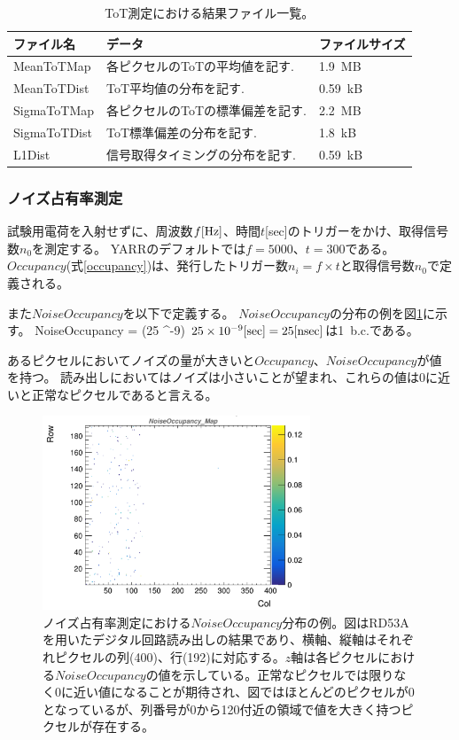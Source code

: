 \begin{table}[tbp]
\begin{center}
\caption[ToT測定における結果ファイル一覧]{ToT測定における結果ファイル一覧。}
\label{tot_result_files}
  \small
  \begin{tabular}{|lll|} \hline
    ファイル名 & データ & ファイルサイズ \\ \hline
    MeanToTMap   & 各ピクセルのToTの平均値を記す.   & 1.9~MB \\ 
    MeanToTDist  & ToT平均値の分布を記す.           & 0.59~kB \\ 
    SigmaToTMap  & 各ピクセルのToTの標準偏差を記す. & 2.2~MB \\ 
    SigmaToTDist & ToT標準偏差の分布を記す.         & 1.8~kB \\ 
    L1Dist       & 信号取得タイミングの分布を記す.  & 0.59~kB \\ \hline 
  \end{tabular}
\end{center}
\end{table}

\subsubsection{ノイズ占有率測定}
試験用電荷を入射せずに、周波数$f[{\rm Hz}]$、時間$t$[sec]のトリガーをかけ、取得信号数$n_0$を測定する。
YARRのデフォルトでは$f=5000、t=300$である。
$Occupancy$(式\ref{occupancy})は、発行したトリガー数$n_i=f \times t$と取得信号数$n_0$で定義される。

また$NoiseOccupancy$を以下で定義する。
$NoiseOccupancy$の分布の例を図\ref{noise_occ}に示す。
\bbb
NoiseOccupancy =  \times (25 ^{-9})
\eee
$25 \times 10^{-9}[{\rm sec}]=25[{\rm nsec}]$は1~b.c.である。

あるピクセルにおいてノイズの量が大きいと$Occupancy$、$NoiseOccupancy$が値を持つ。
読み出しにおいてはノイズは小さいことが望まれ、これらの値は0に近いと正常なピクセルであると言える。

\begin{figure}[bpt]\centering
\includegraphics[width=8cm]{./noise_occ.png}
\caption[ノイズ占有率測定における$NoiseOccupancy$分布の例。]{ノイズ占有率測定における$NoiseOccupancy$分布の例。図はRD53Aを用いたデジタル回路読み出しの結果であり、横軸、縦軸はそれぞれピクセルの列(400)、行(192)に対応する。$z$軸は各ピクセルにおける$NoiseOccupancy$の値を示している。正常なピクセルでは限りなく0に近い値になることが期待され、図ではほとんどのピクセルが0となっているが、列番号が0から120付近の領域で値を大きく持つピクセルが存在する。}
\label{noise_occ}
\end{figure}

